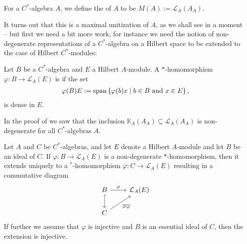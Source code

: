 \begin{definition}
	For a $C^*$-algebra $A$, we define the  of $A$ to be $M(A):=\mathcal{L}_A(A_A)$.
\end{definition}
It turns out that this is a maximal unitization of $A$, as we shall see in a moment -- but first we need a bit more work, for instance we need the notion of non-degenerate representations of a $C^*$-algebra on a Hilbert space to be extended to the case of Hilbert $C^*$-modules:
\begin{definition}
	Let $B$ be a $C^*$-algebra and $E$ a Hilbert $A$-module. A $*$-homomorphism $\varphi \colon B \to \mathcal{L}_A(E)$ is  if the set
	\begin{align*}
		\varphi(B)E:= \mathrm{span}\left\{ \varphi(b)x \mid b \in B  \text{ and } x \in E \right\},
	\end{align*}
	is dense in $E$. 
\end{definition}
\begin{example}
	In the proof of  we saw that the inclusion $\mathbb{K}_A(A_A) \subseteq \mathcal{L}_A(A_A)$ is non-degenerate for all $C^*$-algebras $A$.
	\label{mult:compnondeg}
\end{example}
\begin{proposition}
	Let $A$ and $C$ be $C^*$-algebras, and let $E$ denote a Hilbert $A$-module and let $B$ be an ideal of $C$. If $\varphi \colon B \to \mathcal{L}_A(E)$ is a non-degenerate $*$-homomorphism, then it extends uniquely to a $^*$-homomorphism $\overline \varphi \colon C \to \mathcal{L}_A(E)$ resulting in a commutative diagram
	\begin{equation*}
		\begin{tikzcd}
			B \ar[r, "\varphi"] \ar[d, hook] & \mathcal{L}_A(E)\\
			C \ar[ru, "\exists! \overline  \varphi"'] & 
		\end{tikzcd}
	\end{equation*}
	If further we assume that $\varphi$ is injective and $B$ is an essential ideal of $C$, then the extension is injective. 
	\label{mult:uniqueext}
\end{proposition}
